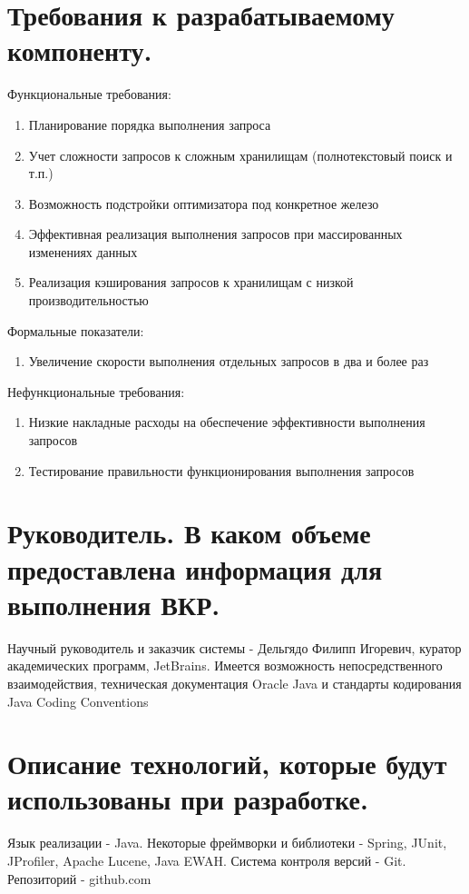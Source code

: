 \documentclass[12pt]{article}
\begin{document}
    \section{Требования к разрабатываемому компоненту.}
        Функциональные требования:
        \begin{enumerate}\itemsep1pt \parskip0pt 
            \item Планирование порядка выполнения запроса
            \item Учет сложности запросов к сложным хранилищам (полнотекстовый поиск и т.п.)
            \item Возможность подстройки оптимизатора под конкретное железо
            \item Эффективная реализация выполнения запросов при массированных изменениях данных
            \item Реализация кэширования запросов к хранилищам с низкой производительностью
        \end{enumerate}

        Формальные показатели: %
        \begin{enumerate}\itemsep1pt \parskip0pt 
            \item Увеличение скорости выполнения отдельных запросов в два и более раз
        \end{enumerate}

        Нефункциональные требования: %
        \begin{enumerate}\itemsep1pt \parskip0pt 
            \item Низкие накладные расходы на обеспечение эффективности выполнения запросов
            \item Тестирование правильности функционирования выполнения запросов
        \end{enumerate}
    \section{Руководитель. В каком объеме предоставлена информация для выполнения ВКР.}
    	Научный руководитель и заказчик системы - Дельгядо Филипп Игоревич, куратор академических программ, JetBrains. Имеется возможность непосредственного взаимодействия, техническая документация Oracle Java и стандарты кодирования Java Coding Conventions
    \section{Описание технологий, которые будут использованы при разработке.}
        Язык реализации - Java. Некоторые фреймворки и библиотеки - Spring, JUnit, JProfiler, Apache Lucene, Java EWAH. Система контроля версий - Git. Репозиторий - github.com
\end{document}
